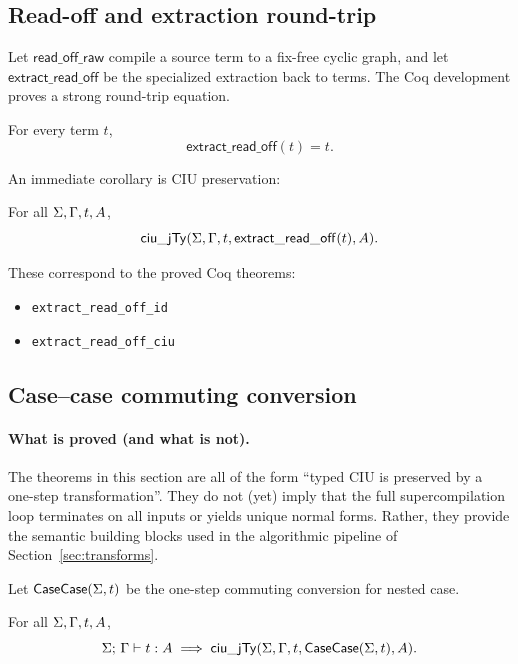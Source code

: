 \subsection{Read-off and extraction round-trip}

Let \(\mathsf{read\_off\_raw}\) compile a source term to a fix-free cyclic graph, and let \(\mathsf{extract\_read\_off}\) be the specialized extraction back to terms.
The Coq development proves a strong round-trip equation.

\begin{theorem}
\label{thm:extract-read-off-id}
For every term \(t\),
\[
  \mathsf{extract\_read\_off}(t) = t.
\]
\end{theorem}

An immediate corollary is CIU preservation:

\begin{theorem}
\label{thm:extract-read-off-ciu}
For all \(\Sigma,\Gamma,t,A\),
\[
  \mathsf{ciu\_jTy}(\Sigma,\Gamma,t,\mathsf{extract\_read\_off}(t),A).
\]
\end{theorem}

These correspond to the proved Coq theorems:
\begin{itemize}
\item \texttt{extract\_read\_off\_id}
\item \texttt{extract\_read\_off\_ciu}
\end{itemize}

\subsection{Case--case commuting conversion}

\paragraph{What is proved (and what is not).}
The theorems in this section are all of the form ``typed CIU is preserved by a one-step transformation''.
They do not (yet) imply that the full supercompilation loop terminates on all inputs or yields unique normal forms.
Rather, they provide the semantic building blocks used in the algorithmic pipeline of Section~\ref{sec:transforms}.

Let \(\mathsf{CaseCase}(\Sigma,t)\) be the one-step commuting conversion for nested case.

\begin{theorem}
\label{thm:casecase-ciu}
For all \(\Sigma,\Gamma,t,A\),
\[
  \Sigma;\,\Gamma \vdash t : A \;\Longrightarrow\; \mathsf{ciu\_jTy}(\Sigma,\Gamma,t,\mathsf{CaseCase}(\Sigma,t),A).
\]
\end{theorem}

